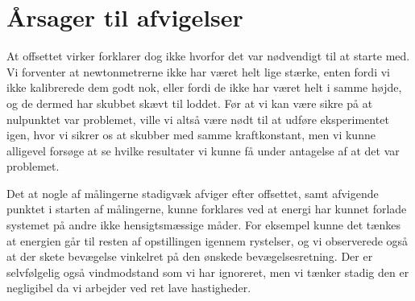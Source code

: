\section{Årsager til afvigelser}
At offsettet virker forklarer dog ikke hvorfor det var nødvendigt til at starte med. Vi forventer at newtonmetrerne ikke har været helt lige stærke, 
enten fordi vi ikke kalibrerede dem godt nok, eller fordi de ikke har været helt i samme højde, og de dermed har skubbet skævt til loddet.
Før at vi kan være sikre på at nulpunktet var problemet, ville vi altså være nødt til at udføre eksperimentet igen, hvor vi sikrer os at skubber med samme kraftkonstant, 
men vi kunne alligevel forsøge at se hvilke resultater vi kunne få under antagelse af at det var problemet. 

Det at nogle af målingerne stadigvæk afviger efter offsettet, samt afvigende punktet i starten af målingerne, kunne forklares ved at energi har kunnet forlade systemet på andre ikke hensigtsmæssige måder. 
For eksempel kunne det tænkes at energien går til resten af opstillingen igennem rystelser, og vi observerede også at der skete bevægelse vinkelret på den ønskede bevægelsesretning.
Der er selvfølgelig også vindmodstand som vi har ignoreret, men vi tænker stadig den er negligibel da vi arbejder ved ret lave hastigheder.

